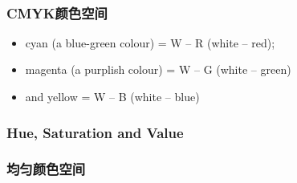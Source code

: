\documentclass{beamer}
\newenvironment{itemizedot}{\begin{itemize} \renewcommand{\labelitemi}{$\bullet$}\renewcommand{\labelitemii}{$\bullet$}\renewcommand{\labelitemiii}{$\bullet$}\renewcommand{\labelitemiv}{$\bullet$}}{\end{itemize}}
\begin{document}
{{\begin{frame}
  \ 
\end{frame}}{\begin{frame}
  \frametitle{CMYK颜色空间}
  \begin{itemizedot}
    \item cyan (a blue-green colour) = W -- R (white -- red);
    
    \item magenta (a purplish colour) = W -- G (white -- green)
    
    \item  and yellow = W -- B (white -- blue)
  \end{itemizedot}
\end{frame}}{\begin{frame}
  \frametitle{Hue, Saturation and Value}
  
  \qquad{}
\end{frame}}{\begin{frame}
  \frametitle{均匀颜色空间}
  

\end{frame}}}
\end{document}
